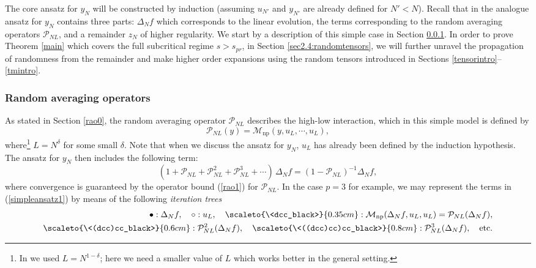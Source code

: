 \documentclass[11 pt,reqno]{amsart}
\theoremstyle{definition}
\theoremstyle{remark}
\numberwithin{equation}{section}
\newcommand{\Pc}{\mathcal{P}}
\renewcommand{\Mc}{\mathcal{M}}
\begin{document}
The core ansatz for $y_N$ will be constructed by induction (assuming $u_{N'}$ and $y_{N'}$ are already defined for $N'<N$). Recall that in \cite{DNY} the analogue ansatz for $y_N$ contains three parts: $\Delta_N f$ which corresponds to the linear evolution, the terms corresponding to the random averaging operators $\Pc_{NL}$, and a remainder $z_N$ of higher regularity. We start by a description of this simple case in Section \ref{raointro}. In order to prove Theorem \ref{main} which covers the full subcritical regime $s>s_{pr}$, in Section \ref{sec2.4:randomtensors}, we will further unravel the propagation of randomness from the remainder and make higher order expansions using the random tensors introduced in Sections \ref{tensorintro}--\ref{tmintro}.
\subsubsection{Random averaging operators}\label{raointro}
As stated in Section \ref{rao0}, the random averaging operator $\Pc_{NL}$ describes the high-low interaction, which in this simple model is defined by 
\begin{equation}\label{PNL}
\Pc_{NL} (y) = \Mc_{\mathrm{np}}(y, u_L, \cdots, u_L),
\end{equation} where\footnote{In \cite{DNY} we used $L=N^{1-\delta}$; here we need a smaller value of $L$ which works better in the general setting.} $L= N^{\delta}$ for some small $\delta$. Note that when we discuss the ansatz for $y_N$, $u_L$ has already been defined by the induction hypothesis. The ansatz for $y_N$ then includes the following term:
\begin{equation}\label{simpleansatz1}
(1 + \Pc_{NL}+  \Pc^2_{NL} + \Pc^3_{NL}+\cdots)\,\Delta_N f = (1-\Pc_{NL})^{-1} \Delta_N f,
\end{equation}
where convergence is guaranteed by the operator bound (\ref{rao1}) for $\Pc_{NL}$.  In the case $p=3$ for example, we may represent  the terms in (\ref{simpleansatz1}) by means of the following \emph{iteration trees}
\begin{equation}\label{symbol1}
\begin{aligned}
\bullet: \Delta_N f,\quad \circ: u_L,\quad \scaleto{\<dcc_black>}{0.35cm}: \Mc_{\mathrm{np}}(\Delta_N f, u_L, u_L)=\Pc_{NL} (\Delta_N f),\\ 
\scaleto{\<(dcc)cc_black>}{0.6cm}: \Pc^2_{NL} (\Delta_N f),\quad
\scaleto{\<((dcc)cc)cc_black>}{0.8cm}: \Pc^3_{NL} (\Delta_N f), \quad\textrm{etc.}
\end{aligned}\end{equation}
\end{document}
